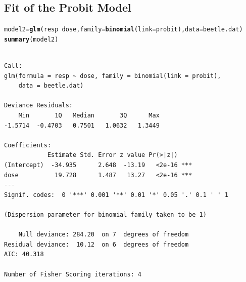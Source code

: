\documentclass[oneside]{book}\usepackage[]{graphicx}\usepackage[svgnames]{xcolor}
\makeatletter
\newcommand{\hlopt}[1]{\textcolor[rgb]{0,0,0}{#1}}%
\newcommand{\hlstd}[1]{\textcolor[rgb]{0.345,0.345,0.345}{#1}}%
\newcommand{\hlkwb}[1]{\textcolor[rgb]{0.69,0.353,0.396}{#1}}%
\newcommand{\hlkwc}[1]{\textcolor[rgb]{0.333,0.667,0.333}{#1}}%
\newcommand{\hlkwd}[1]{\textcolor[rgb]{0.737,0.353,0.396}{\textbf{#1}}}%
\newenvironment{kframe}{%
 \def\at@end@of@kframe{}%
 \ifinner\ifhmode%
  \def\at@end@of@kframe{\end{minipage}}%
  \begin{minipage}{\columnwidth}%
 \fi\fi%
 \def\FrameCommand##1{\hskip\@totalleftmargin \hskip-\fboxsep
 \colorbox{shadecolor}{##1}\hskip-\fboxsep
     \hskip-\linewidth \hskip-\@totalleftmargin \hskip\columnwidth}%
 \MakeFramed {\advance\hsize-\width
   \@totalleftmargin\z@ \linewidth\hsize
   \@setminipage}}%
 {\par\unskip\endMakeFramed%
 \at@end@of@kframe}
\newenvironment{knitrout}{}{} %
\makeatother
\begin{document}
\subsection*{Fit of the Probit Model}
\begin{knitrout}
\color{fgcolor}\begin{kframe}
\begin{alltt}
\hlstd{model2} \hlkwb{=} \hlkwd{glm}\hlstd{(resp} \hlopt{~} \hlstd{dose,} \hlkwc{family} \hlstd{=} \hlkwd{binomial}\hlstd{(}\hlkwc{link} \hlstd{= probit),} \hlkwc{data} \hlstd{= beetle.dat)}
\hlkwd{summary}\hlstd{(model2)}
\end{alltt}
\begin{verbatim}

Call:
glm(formula = resp ~ dose, family = binomial(link = probit), 
    data = beetle.dat)

Deviance Residuals: 
    Min       1Q   Median       3Q      Max  
-1.5714  -0.4703   0.7501   1.0632   1.3449  

Coefficients:
            Estimate Std. Error z value Pr(>|z|)    
(Intercept)  -34.935      2.648  -13.19   <2e-16 ***
dose          19.728      1.487   13.27   <2e-16 ***
---
Signif. codes:  0 '***' 0.001 '**' 0.01 '*' 0.05 '.' 0.1 ' ' 1

(Dispersion parameter for binomial family taken to be 1)

    Null deviance: 284.20  on 7  degrees of freedom
Residual deviance:  10.12  on 6  degrees of freedom
AIC: 40.318

Number of Fisher Scoring iterations: 4
\end{verbatim}
\end{kframe}
\end{knitrout}
\end{document}
